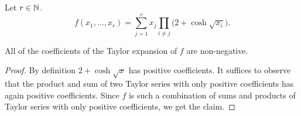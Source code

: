 \begin{definition}
  \label{def:f}
  \leanok
  Let $r \in \mathbb{N}$.
  \begin{equation}\label{eq:f}
    f(x_1,\dots,x_r) = \sum_{j = 1}^r x_j \prod_{i \ne j} \big( 2 + \cosh\sqrt{x_i} \big).
  \end{equation}
\end{definition}


\begin{lemma}
  \label{lem:taylor-nonneg}
  All of the coefficients of the Taylor expansion of $f$ are non-negative.
\end{lemma}
%
\begin{proof}
  By definition $2+\cosh\sqrt{x}$ has positive coefficients. It suffices to observe that the product and sum of two Taylor series with only positive coefficients has again positive coefficients. Since $f$ is such a combination of sums and products of Taylor series with only positive coefficients, we get the claim.
\end{proof}